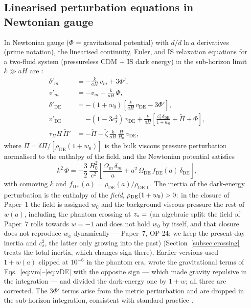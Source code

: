 \documentclass[12pt,a4paper]{article}
\newcommand{\wz}{w_0}
\newcommand{\OmDE}{\Omega_{\mathrm{DE}}}
\newcommand{\tauPi}{\tau_\Pi}
\newcommand{\ztilde}{\tilde{\zeta}}
\newcommand{\Pitilde}{\tilde{\Pi}}
\begin{document}
\subsection{Linearised perturbation equations in Newtonian gauge}
\label{subsec:perturb_eqs}

In Newtonian gauge ($\Phi$ = gravitational potential) with $d/d\ln a$ derivatives
(prime notation), the linearised continuity, Euler, and IS relaxation equations
for a two-fluid system (pressureless CDM + IS dark energy) in the sub-horizon
limit $k \gg aH$ are \citep{Hu1998,Maartens1996}:
\begin{align}
  \delta'_m &= -\frac{k}{aH}\,v_m + 3\Phi',
  \label{eq:deltam} \\
  v'_m      &= -v_m + \frac{k}{aH}\,\Phi,
  \label{eq:vm} \\
  \delta'_{\mathrm{DE}} &= -(1+\wz)\!\left[\frac{k}{aH}\,v_{\mathrm{DE}} - 3\Phi'\right],
  \label{eq:deltaDE} \\
  v'_{\mathrm{DE}} &= -(1-3c^2_s)\,v_{\mathrm{DE}}
    + \frac{k}{aH}\!\left[\frac{c^2_s\,\delta_{\mathrm{DE}}}{1+\wz}
    + \Pitilde + \Phi\right],
  \label{eq:vDE} \\
  \tauPi H\,\Pitilde' &= -\Pitilde - \ztilde\,\frac{k}{aH}\,\frac{H}{H_0}\,v_{\mathrm{DE}},
  \label{eq:Pi}
\end{align}
where $\Pitilde = \delta\Pi/[\rho_{\mathrm{DE}}(1+\wz)]$ is the bulk viscous pressure
perturbation normalised to the enthalpy of the field, and the Newtonian potential satisfies
\begin{equation}
  k^2\,\Phi = -\frac{3}{2}\,\frac{H_0^2}{c^2}\left[\frac{\Omega_m\,\delta_m}{a}
    + a^2\,\OmDE\,f_{\mathrm{DE}}(a)\,\delta_{\mathrm{DE}}\right],
  \label{eq:Poisson}
\end{equation}
with comoving $k$ and $f_{\mathrm{DE}}(a) = \rho_{\mathrm{DE}}(a)/\rho_{\mathrm{DE},0}$.
The inertia of the dark-energy perturbation is the enthalpy of the \emph{field},
$\rho_{\rm DE}(1+\wz)>0$: in the closure of Paper~1 the field is assigned $w_0$ and the
background viscous pressure the rest of $w(a)$, including the phantom
crossing at $z_*=\val{z_cruce}$ (an algebraic split: the field of Paper~7 rolls towards
$w=-1$ and does not hold $w_0$ by itself, and that closure does not reproduce
$w_a$ dynamically --- Paper~7, OP-24; we keep the present-day inertia and $c_s^2$, the
latter only growing into the past) (Section~\ref{subsec:crossing} treats the total
inertia, which changes sign there). Earlier versions used $1+w(a)$ clipped at
$10^{-6}$ in the phantom era, wrote the gravitational terms of
Eqs.~\eqref{eq:vm}--\eqref{eq:vDE} with the opposite sign --- which made gravity
repulsive in the integration --- and divided the dark-energy one by $1+w$; all three are corrected.
The $3\Phi'$ terms arise from the metric perturbation and are dropped in the
sub-horizon integration, consistent with standard practice \citep{Hu1998}.
\end{document}
